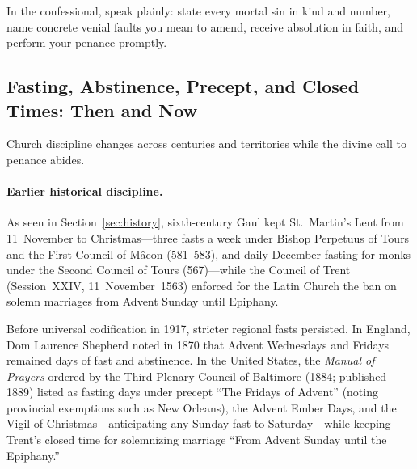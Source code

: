In the confessional, speak plainly: state every mortal sin in kind and number, name concrete venial faults you mean to amend, receive absolution in faith, and perform your penance promptly.

\subsection{Fasting, Abstinence, Precept, and Closed Times: Then and Now}

Church discipline changes across centuries and territories while the divine call to penance abides.

\paragraph{Earlier historical discipline.}
As seen in Section~\ref{sec:history}, sixth-century Gaul kept St.~Martin's Lent from 11~November to Christmas---three fasts a week under Bishop Perpetuus of Tours and the First Council of M\^acon (581--583), and daily December fasting for monks under the Second Council of Tours (567)---while the Council of Trent (Session~XXIV, 11~November~1563) enforced for the Latin Church the ban on solemn marriages from Advent Sunday until Epiphany.

Before universal codification in 1917, stricter regional fasts persisted. In England, Dom Laurence Shepherd noted in 1870 that Advent Wednesdays and Fridays remained days of fast and abstinence. In the United States, the \textit{Manual of Prayers} ordered by the Third Plenary Council of Baltimore (1884; published 1889) listed as fasting days under precept ``The Fridays of Advent'' (noting provincial exemptions such as New Orleans), the Advent Ember Days, and the Vigil of Christmas---anticipating any Sunday fast to Saturday---while keeping Trent's closed time for solemnizing marriage ``From Advent Sunday until the Epiphany.''

